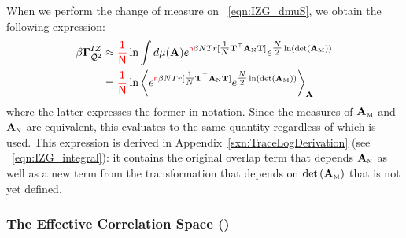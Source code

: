 
When we perform the change of measure on
\EQN~\ref{eqn:IZG_dmuS},
we obtain the following expression: %
\begin{align}
  \label{eqn:IFA2_integral}
  \nonumber 
  \beta\mathbf{\Gamma}^{IZ}_{\bar{\mathcal{Q}}^{2}} 
  &\approx 
    {\color{red}\sf{\frac{1}{N}}}
  \ln \int d\mu(\mathbf{A})
  e^{{\color{red}\sf{n}}\beta N Tr[\tfrac{1}{N}{\mathbf{T}}^{\top}{\mathbf{A}}_{\text{\tiny N}}{\mathbf{T}}] }
  e^{\tfrac{N}{2}\ln(\mbox{}{\text{det}}\left({\mathbf{A}}_{\text{\tiny M}}\right))} \\
  & = 
  {\color{red}\sf{\frac{1}{N}}}
  \ln
  \left\langle
  e^{{\color{red}\sf{n}}\beta N Tr[\tfrac{1}{N}{\mathbf{T}}^{\top}{\mathbf{A}}_{\text{\tiny N}}{\mathbf{T}}] }
  e^{\tfrac{N}{2}\ln(\mbox{}{\text{det}}\left({\mathbf{A}}_{\text{\tiny M}}\right))}
    \right\rangle_{\mathbf{A}}
\end{align}
where the latter expresses the former in \BraKet notation. Since the measures of ${\mathbf{A}}_{\text{\tiny M}}$ and ${\mathbf{A}}_{\text{\tiny N}}$ are equivalent, this evaluates to the same quantity regardless of which is used.
This expression is derived in Appendix~\ref{sxn:TraceLogDerivation} (see \EQN~\ref{eqn:IZG_integral}):
it contains the original overlap term that depends ${\mathbf{A}}_{\text{\tiny N}}$ as well as a new term from
the transformation that depends on $\mbox{}{\text{det}}\left({\mathbf{A}}_{\text{\tiny M}}\right)$ that is not yet defined.


\subsubsection{The Effective Correlation Space (\ECS)}

